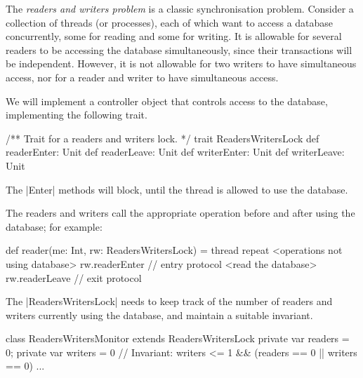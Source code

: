 \begin{slide}

The \emph{readers and writers problem} is a classic synchronisation problem.
Consider a collection of threads (or processes), each of which want to access
a database concurrently, some for reading and some for writing.  It is
allowable for several readers to be accessing the database simultaneously,
since their transactions will be independent.  However, it is not allowable
for two writers to have simultaneous access, nor for a reader and writer to
have simultaneous access.
\end{slide}



\begin{slide}

We will implement a controller object that controls access to the database,
implementing the following trait.
\begin{scala}
/** Trait for a readers and writers lock. */
trait ReadersWritersLock{
  def readerEnter: Unit
  def readerLeave: Unit
  def writerEnter: Unit
  def writerLeave: Unit
}
\end{scala}
%
The |Enter| methods will block, until the thread is allowed to use the
database. 
\end{slide}


\begin{slide}

The readers and writers call the appropriate operation before
and after  using the database; for example:
%
\begin{scala}
def reader(me: Int, rw: ReadersWritersLock) = thread{
  repeat{
    <operations not using database>
    rw.readerEnter // entry protocol
    <read the database>
    rw.readerLeave // exit protocol
  }
}
\end{scala}
\end{slide}


\begin{slide}

The |ReadersWritersLock| needs to keep track of the number of readers and
writers currently using the database, and maintain a suitable invariant.
%
\begin{scala}
class ReadersWritersMonitor extends ReadersWritersLock{
  private var readers = 0; private var writers = 0
  // Invariant: writers <= 1 && (readers == 0 || writers == 0)
  ...
}    
\end{scala}
\end{slide}


